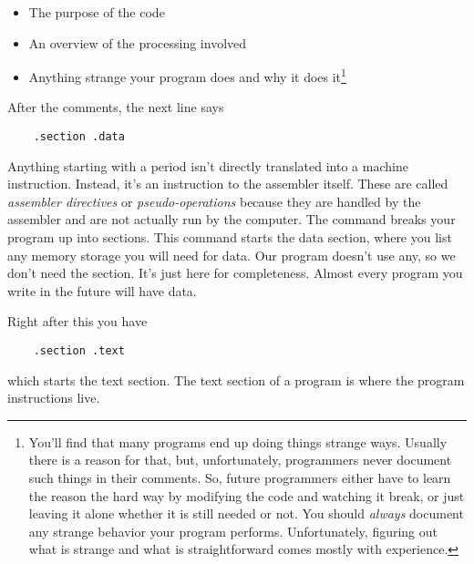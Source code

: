 \begin{itemize}
\item The purpose of the code 
\item An overview of the processing involved 

\item Anything strange your program does and why it does 
it\footnote{You'll find that many programs end up doing things strange
ways.  Usually there is a reason for that, but, unfortunately, programmers
never document such things in their comments.  So, future programmers either
have to learn the reason the hard way by modifying the code and watching it
break, or just leaving it alone whether it is still needed or not.  You
should \emph{always} document any strange behavior your program
performs.  Unfortunately, figuring out what is strange and what is straightforward comes mostly with experience.} 
\end{itemize}

After the comments, the next line says

\begin{simpletyping}
\begin{lstlisting}
	.section .data
\end{lstlisting}
\end{simpletyping}

Anything starting with a period isn't directly translated into a machine 
instruction.  Instead, it's an instruction to the assembler itself.  These
are called \emph{assembler directives} or \emph{pseudo-operations} because they are handled by the assembler and are not actually run by the computer.
The 
command breaks your program up into sections.  This command starts the
data section, 
where you list any memory storage you will need for data.  
Our program doesn't use any, so we don't need the section.  It's just here
for completeness.  Almost every program you write in the future will have data.

Right after this you have

\begin{simpletyping}
\begin{lstlisting}
	.section .text
\end{lstlisting}
\end{simpletyping}

which starts the text section.  The text 
section of a program 
is where the program instructions live.

